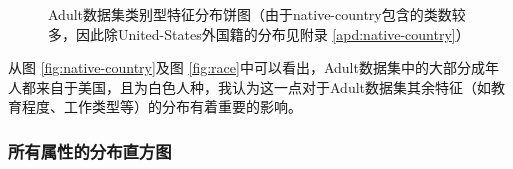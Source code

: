 \documentclass[12pt,a4paper]{article}
\theoremstyle{definition}
\begin{document}
\begin{figure}[H]
	\centering
	\caption{Adult数据集类别型特征分布饼图（由于native-country包含的类数较多，因此除United-States外国籍的分布见附录 \ref{apd:native-country}）}
	\label{fig:class_feature_dis2}
\end{figure}

从图 \ref{fig:native-country}及图 \ref{fig:race}中可以看出，Adult数据集中的大部分成年人都来自于美国，且为白色人种，我认为这一点对于Adult数据集其余特征（如教育程度、工作类型等）的分布有着重要的影响。

\subsubsection{所有属性的分布直方图}
\end{document}
